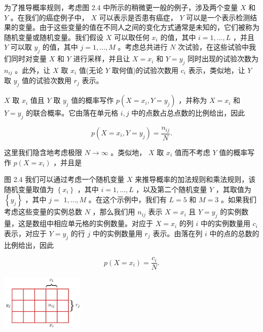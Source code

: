 \documentclass[10pt]{article}
\begin{document}
为了推导概率规则，考虑图 2.4 中所示的稍微更一般的例子，涉及两个变量 \(X\) 和 \(Y\) 。在我们的癌症例子中， \(X\) 可以表示是否患有癌症， \(Y\) 可以是一个表示检测结果的变量。由于这些变量的值在不同人之间的变化方式通常是未知的，它们被称为随机变量或随机变量。我们假设 \(X\) 可以取任何 \({x}_{i}\) 的值，其中 \(i = 1,\ldots ,L\) ，并且 \(Y\) 可以取 \({y}_{j}\) 的值，其中 \(j = 1,\ldots ,M\) 。考虑总共进行 \(N\) 次试验，在这些试验中我们同时对变量 \(X\) 和 \(Y\) 进行采样，并且让 \(X = {x}_{i}\) 和 \(Y = {y}_{j}\) 同时出现的试验次数为 \({n}_{ij}\) 。此外，让 \(X\) 取 \({x}_{i}\) 值(无论 \(Y\) 取何值)的试验次数用 \({c}_{i}\) 表示，类似地，让 \(Y\) 取 \({y}_{j}\) 值的试验次数用 \({r}_{j}\) 表示。

\(X\) 取 \({x}_{i}\) 值且 \(Y\) 取 \({y}_{j}\) 值的概率写作 \(p\left( {X = {x}_{i},Y = {y}_{j}}\right)\) ，并称为 \(X = {x}_{i}\) 和 \(Y = {y}_{j}\) 的联合概率。它由落在单元格 \(i,j\) 中的点数占总点数的比例给出，因此

\[
p\left( {X = {x}_{i},Y = {y}_{j}}\right)  = \frac{{n}_{ij}}{N}. \tag{2.1}
\]

这里我们隐含地考虑极限 \(N \rightarrow  \infty\) 。类似地， \(X\) 取 \({x}_{i}\) 值而不考虑 \(Y\) 值的概率写作 \(p\left( {X = {x}_{i}}\right)\) ，并且是

图 2.4 我们可以通过考虑一个随机变量 \(X\) 来推导概率的加法规则和乘法规则，该随机变量取值为 \(\left\{  {x}_{i}\right\}\) ，其中 \(i = 1,\ldots ,L\) ，以及第二个随机变量 \(Y\) ，其取值为 \(\left\{  {y}_{j}\right\}\) ，其中 \(j =\)  \(1,\ldots ,M\) 。在这个示例中，我们有 \(L = 5\) 和 \(M = 3\) 。如果我们考虑这些变量的实例总数 \(N\) ，那么我们用 \({n}_{ij}\) 表示 \(X = {x}_{i}\) 且 \(Y = {y}_{j}\) 的实例数量，这是数组中相应单元格的实例数量。对应于 \(X = {x}_{i}\) 的列 \(i\) 中的实例数量用 \({c}_{i}\) 表示，对应于 \(Y = {y}_{j}\) 的行 \(j\) 中的实例数量用 \({r}_{j}\) 表示。由落在列 \(i\) 中的点的总数的比例给出，因此

\[
p\left( {X = {x}_{i}}\right)  = \frac{{c}_{i}}{N}. \tag{2.2}
\]

\begin{center}
\includegraphics[max width=0.3\textwidth]{images/0194e279-9b28-703a-88f4-c3ac21e2010d_46_1083_344_466_312_0.jpg}
\end{center}
\hspace*{3em} 
\end{document}
